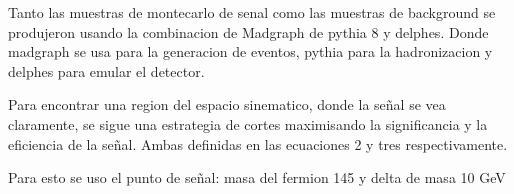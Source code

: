 \documentclass[12pt,letterpaper]{article}
\newcounter{example}[enumi]
\begin{document}
	\begin{tcolorbox}[title= Slide \arabic{example} ]
	Tanto las muestras de montecarlo de senal como las muestras de background se produjeron usando la combinacion de Madgraph de pythia 8 y delphes.
	Donde madgraph se usa para la generacion de eventos, pythia para la hadronizacion y delphes para emular el detector.
	\end{tcolorbox}
	
	
	
		
	
		
	
	\begin{tcolorbox}[title= Slide \arabic{example} ]%
	Para encontrar una region del espacio sinematico, donde la señal se vea claramente, se sigue una estrategia de cortes maximisando la significancia y la eficiencia de la señal.
	Ambas definidas  en las ecuaciones 2 y tres respectivamente.
	
	Para esto se uso el punto de señal: masa del fermion 145 y delta de masa 10 GeV
	\end{tcolorbox}
	
	\begin{tcolorbox}[title= Slide \arabic{example} ]
		
	\end{tcolorbox}
	
	\begin{tcolorbox}[title= Slide \arabic{example} ]
		
		\stepcounter{example}	
	\end{tcolorbox}
	
\end{document}
